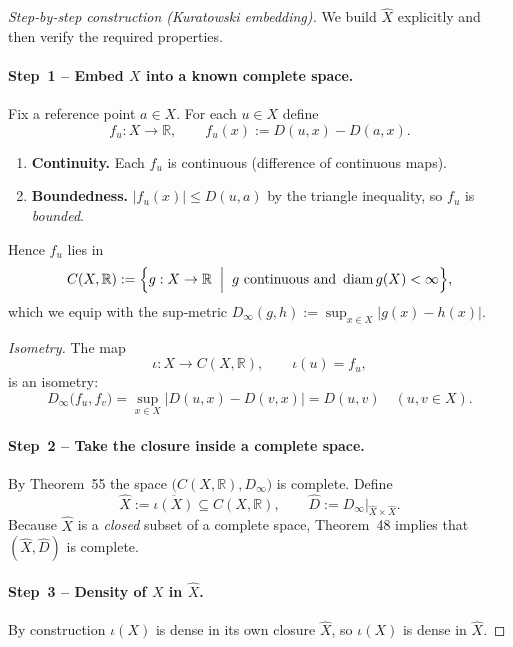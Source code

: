 \documentclass[12pt]{article}
\theoremstyle{definition} %
\theoremstyle{plain} %
\begin{document}
\begin{proof}[Step‑by‑step construction (Kuratowski embedding)]
  We build $\widehat{X}$ explicitly and then verify the required
  properties.

  \paragraph{\textbf{Step 1 – Embed $X$ into a known complete space.}}
  Fix a reference point $a\in X$.
  For each $u\in X$ define
  \[
      f_u:X\longrightarrow\mathbb R,
      \qquad
      f_u(x):=D(u,x)-D(a,x).
  \]
  \begin{enumerate}[label=\alph*.]
      \item \textbf{Continuity.}  
            Each $f_u$ is continuous (difference of continuous maps).
      \item \textbf{Boundedness.}  
            $\displaystyle|f_u(x)|
            \le D(u,a)$ by the triangle inequality, so
            $f_u$ is \emph{bounded}.
  \end{enumerate}
  Hence $f_u$ lies in
  \[
      C(X,\mathbb R):=\Bigl\{g:X\to\mathbb R\;\Bigm|\;
          g\text{ continuous and } \operatorname{diam}g(X)<\infty\Bigr\},
  \]
  which we equip with the sup‑metric
  $
      D_\infty(g,h):=\sup_{x\in X}|g(x)-h(x)|.
  $

  \smallskip
  \emph{Isometry.}  
  The map
  \[
      \iota:X\to C(X,\mathbb R),\qquad
      \iota(u)=f_u,
  \]
  is an isometry:
  \[
      D_\infty\!\bigl(f_u,f_v\bigr)
      =\sup_{x\in X}\bigl|D(u,x)-D(v,x)\bigr|
      =D(u,v)\quad(u,v\in X).
  \]

  \paragraph{\textbf{Step 2 – Take the closure inside a complete space.}}
  By Theorem 55 the space
  $\bigl(C(X,\mathbb R),D_\infty\bigr)$ is complete.
  Define
  \[
      \widehat{X}:=\overline{\iota(X)}
      \subseteq C(X,\mathbb R),
      \qquad
      \widehat{D}:=D_\infty\big|_{\widehat{X}\times\widehat{X}}.
  \]
  Because $\widehat{X}$ is a \emph{closed} subset of a complete space,
  Theorem 48 implies that $(\widehat{X},\widehat{D})$ is complete.

  \paragraph{\textbf{Step 3 – Density of $X$ in $\widehat{X}$.}}
  By construction $\iota(X)$ is dense in its own closure
  $\widehat{X}$, so $\iota(X)$ is dense in $\widehat{X}$.


\end{proof}
\end{document}
